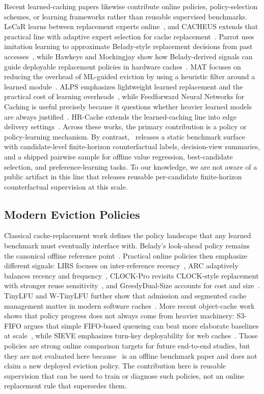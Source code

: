 Recent learned-caching papers likewise contribute online policies, policy-selection schemes, or learning frameworks rather than reusable supervised benchmarks. LeCaR learns between replacement experts online~\cite{vietri2018lecar}, and CACHEUS extends that practical line with adaptive expert selection for cache replacement~\cite{rodriguez2021cacheus}. Parrot uses imitation learning to approximate Belady-style replacement decisions from past accesses~\cite{liu2020parrot}, while Hawkeye and Mockingjay show how Belady-derived signals can guide deployable replacement policies in hardware caches~\cite{jain2016hawkeye,shah2022mockingjay}. MAT focuses on reducing the overhead of ML-guided eviction by using a heuristic filter around a learned module~\cite{yang2023mat}. ALPS emphasizes lightweight learned replacement and the practical cost of learning overheads~\cite{shahout2024alps}, while Feedforward Neural Networks for Caching is useful precisely because it questions whether heavier learned models are always justified~\cite{fedchenko2018fnncache}. HR-Cache extends the learned-caching line into edge delivery settings~\cite{torabi2024hrcache}. Across these works, the primary contribution is a policy or policy-learning mechanism. By contrast, \lafc\ releases a static benchmark surface with candidate-level finite-horizon counterfactual labels, decision-view summaries, and a shipped pairwise sample for offline value regression, best-candidate selection, and preference-learning tasks. To our knowledge, we are not aware of a public artifact in this line that releases reusable per-candidate finite-horizon counterfactual supervision at this scale.

\subsection{Modern Eviction Policies}

Classical cache-replacement work defines the policy landscape that any learned benchmark must eventually interface with. Belady's look-ahead policy remains the canonical offline reference point~\cite{belady1966study}. Practical online policies then emphasize different signals: LIRS focuses on inter-reference recency~\cite{jiang2002lirs}, ARC adaptively balances recency and frequency~\cite{megiddo2003arc}, CLOCK-Pro revisits CLOCK-style replacement with stronger reuse sensitivity~\cite{jiang2005clockpro}, and GreedyDual-Size accounts for cost and size~\cite{cao1997greedydual}. TinyLFU and W-TinyLFU further show that admission and segmented cache management matter in modern software caches~\cite{einziger2017tinylfu,einziger2018wtinylfu}. More recent object-cache work shows that policy progress does not always come from heavier machinery: S3-FIFO argues that simple FIFO-based queueing can beat more elaborate baselines at scale~\cite{yang2023s3fifo}, while SIEVE emphasizes turn-key deployability for web caches~\cite{zhang2024sieve}. Those policies are strong online comparison targets for future end-to-end studies, but they are not evaluated here because \lafc\ is an offline benchmark paper and does not claim a new deployed eviction policy. The contribution here is reusable supervision that can be used to train or diagnose such policies, not an online replacement rule that supersedes them.

